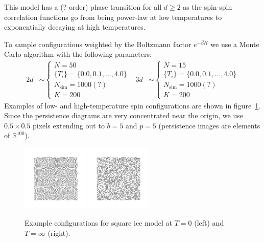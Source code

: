 \documentclass[11pt]{article}
\begin{document}
This model has a (?-order) phase transition for all $d\geq 2$ as the spin-spin correlation functions go from being power-law at low temperatures to exponentially decaying at high temperatures.

To sample configurations weighted by the Boltzmann factor $e^{-\beta H}$ we use a Monte Carlo algorithm with the following parameters:
\begin{align}
    2d&\sim\left\{\begin{array}{l}
        N = 50\\
        \{T_i\} = \{0.0,0.1,\ldots,4.0\}\\
        N_\text{sim} = 1000(?)\\
        K = 200
    \end{array}\right. & 3d&\sim\left\{\begin{array}{l}
        N = 15\\
        \{T_i\} = \{0.0,0.1,\ldots,4.0\}\\
        N_\text{sim} = 1000(?)\\
        K = 200
    \end{array}\right.
\end{align}
Examples of low- and high-temperature spin configurations are shown in figure~\ref{fig:SquareiceExampleConfigs}. Since the persistence diagrams are very concentrated near the origin, we use $0.5\times0.5$ pixels extending out to $b=5$ and $p=5$ (persistence images are elements of $\mathbb{R}^{100}$).

\begin{figure}[h]
    \centering
    \includegraphics[width=0.28\textwidth]{squareice_images/squareice_T=0.png}
    \includegraphics[width=0.28\textwidth]{squareice_images/squareice_T=inf.png}
    \caption{Example configurations for square ice model at $T=0$ (left) and $T=\infty$ (right).}
    \label{fig:SquareiceExampleConfigs}
\end{figure}
\end{document}
